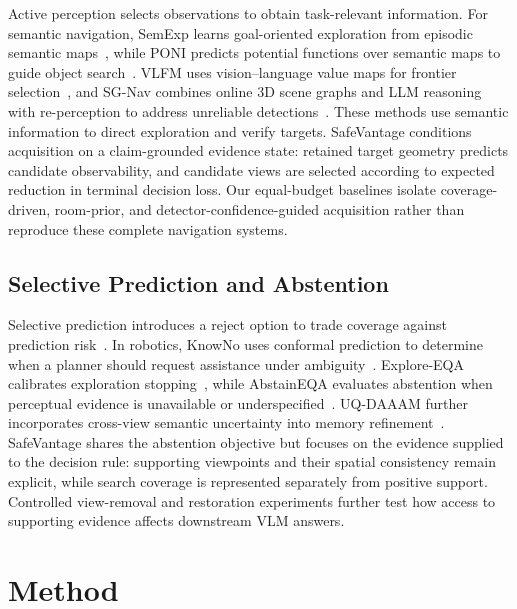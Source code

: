 \documentclass[letterpaper, 10 pt, conference]{ieeeconf}
\newcommand{\method}{SafeVantage}
\begin{document}
Active perception selects observations to obtain task-relevant information. For semantic navigation, SemExp learns goal-oriented exploration from episodic semantic maps~\citep{chaplot2020object}, while PONI predicts potential functions over semantic maps to guide object search~\citep{ramakrishnan2022poni}. VLFM uses vision--language value maps for frontier selection~\citep{yokoyama2024vlfm}, and SG-Nav combines online 3D scene graphs and LLM reasoning with re-perception to address unreliable detections~\citep{yin2024sg}. These methods use semantic information to direct exploration and verify targets.
\method{} conditions acquisition on a claim-grounded evidence state: retained target geometry predicts candidate observability, and candidate views are selected according to expected reduction in terminal decision loss.
Our equal-budget baselines isolate coverage-driven, room-prior, and detector-confidence-guided acquisition rather than reproduce these complete navigation systems.

\subsection{Selective Prediction and Abstention}

Selective prediction introduces a reject option to trade coverage against prediction risk~\citep{geifman2019selectivenet, huang2026knowledge}. In robotics, KnowNo uses conformal prediction to determine when a planner should request assistance under ambiguity~\citep{ren2023knowno}. Explore-EQA calibrates exploration stopping~\citep{exploreeqa2024}, while AbstainEQA evaluates abstention when perceptual evidence is unavailable or underspecified~\citep{wu2026abstaineqa}. UQ-DAAAM further incorporates cross-view semantic uncertainty into memory refinement~\citep{zhang2026uqdaaam}. \method{} shares the abstention objective but focuses on the evidence supplied to the decision rule: supporting viewpoints and their spatial consistency remain explicit, while search coverage is represented separately from positive support. Controlled view-removal and restoration experiments further test how access to supporting evidence affects downstream VLM answers.



\section{Method}
\label{sec:method}
\end{document}
